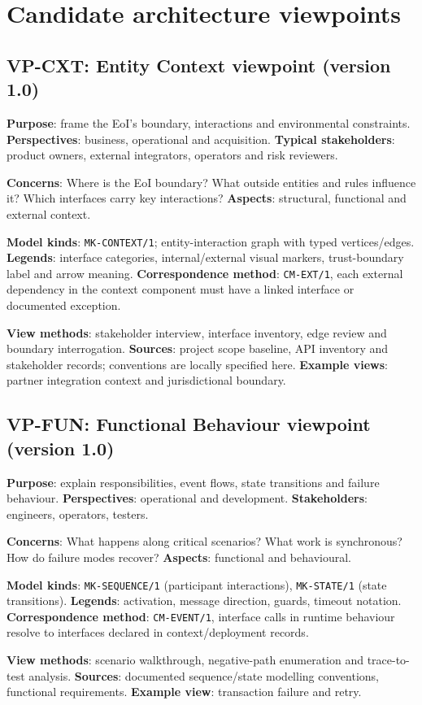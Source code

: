 \documentclass[11pt,letterpaper]{article}
\begin{document}
\section{Candidate architecture viewpoints}
\subsection{VP-CXT: Entity Context viewpoint (version 1.0)}
\textbf{Purpose}: frame the EoI's boundary, interactions and environmental constraints. \textbf{Perspectives}: business, operational and acquisition. \textbf{Typical stakeholders}: product owners, external integrators, operators and risk reviewers.\par
\textbf{Concerns}: Where is the EoI boundary? What outside entities and rules influence it? Which interfaces carry key interactions? \textbf{Aspects}: structural, functional and external context.\par
\textbf{Model kinds}: \texttt{MK-CONTEXT/1}; entity-interaction graph with typed vertices/edges. \textbf{Legends}: interface categories, internal/external visual markers, trust-boundary label and arrow meaning. \textbf{Correspondence method}: \texttt{CM-EXT/1}, each external dependency in the context component must have a linked interface or documented exception.\par
\textbf{View methods}: stakeholder interview, interface inventory, edge review and boundary interrogation. \textbf{Sources}: project scope baseline, API inventory and stakeholder records; conventions are locally specified here. \textbf{Example views}: partner integration context and jurisdictional boundary.\par
\subsection{VP-FUN: Functional Behaviour viewpoint (version 1.0)}
\textbf{Purpose}: explain responsibilities, event flows, state transitions and failure behaviour. \textbf{Perspectives}: operational and development. \textbf{Stakeholders}: engineers, operators, testers.\par
\textbf{Concerns}: What happens along critical scenarios? What work is synchronous? How do failure modes recover? \textbf{Aspects}: functional and behavioural.\par
\textbf{Model kinds}: \texttt{MK-SEQUENCE/1} (participant interactions), \texttt{MK-STATE/1} (state transitions). \textbf{Legends}: activation, message direction, guards, timeout notation. \textbf{Correspondence method}: \texttt{CM-EVENT/1}, interface calls in runtime behaviour resolve to interfaces declared in context/deployment records.\par
\textbf{View methods}: scenario walkthrough, negative-path enumeration and trace-to-test analysis. \textbf{Sources}: documented sequence/state modelling conventions, functional requirements. \textbf{Example view}: transaction failure and retry.\par
\end{document}
